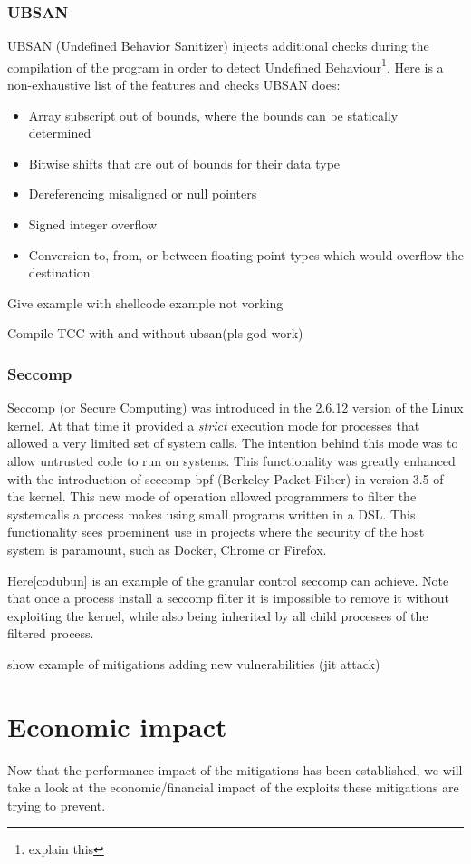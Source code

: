 \documentclass{article}
\begin{document}
\subsubsection{UBSAN}
UBSAN (Undefined Behavior Sanitizer) injects additional checks during the compilation of
the program in order to detect Undefined Behaviour\footnote{explain this}. Here is a
non-exhaustive list of the features and checks UBSAN does:

\begin{itemize}
  \item Array subscript out of bounds, where the bounds can be statically determined
  \item Bitwise shifts that are out of bounds for their data type
  \item Dereferencing misaligned or null pointers
  \item Signed integer overflow
  \item Conversion to, from, or between floating-point types which would overflow the destination
\end{itemize}

Give example with shellcode example not vorking

Compile TCC with and without ubsan(pls god work)

\subsubsection{Seccomp}
Seccomp (or Secure Computing) was introduced in the 2.6.12 version of the
Linux kernel. At that time it provided a \emph{strict} execution mode for
processes that allowed a very limited set of system calls. The intention
behind this mode was to allow untrusted code to run on systems. This
functionality was greatly enhanced with the introduction of seccomp-bpf
(Berkeley Packet Filter) in version 3.5 of the kernel. This new mode of
operation allowed programmers to filter the systemcalls a process makes
using small programs written in a DSL. This functionality sees proeminent
use in projects where the security of the host system is paramount, such as
Docker, Chrome or Firefox.

Here\ref{codubun} is an example of the granular control seccomp can achieve.
Note that once a process install a seccomp filter it is impossible to remove
it without exploiting the kernel, while also being inherited by all child
processes of the filtered process.

show example of mitigations adding new vulnerabilities (jit attack)
\section{Economic impact}%
Now that the performance impact of the mitigations has been established, we
will take a look at the economic/financial impact of the exploits these
mitigations are trying to prevent.
\end{document}
